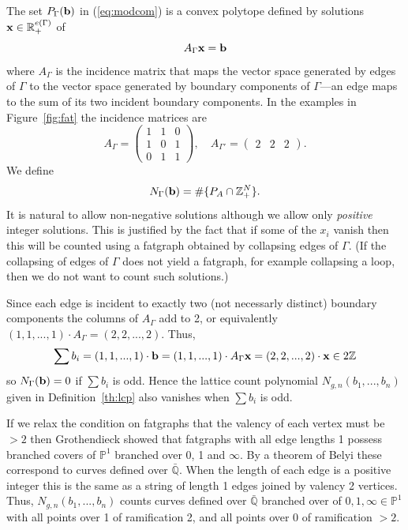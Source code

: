 \documentclass{amsart}
\newcommand{\bp}{\mathbb{P}}
\newcommand{\bq}{\mathbb{Q}}
\newcommand{\br}{\mathbb{R}}
\newcommand{\bz}{\mathbb{Z}}
\begin{document}
The set $P_{\Gamma}({\bf b})$ in (\ref{eq:modcom}) is a convex polytope defined by solutions ${\bf x}\in\br_+^{e(\Gamma)}$ of
\[ A_{\Gamma}{\bf x}={\bf b}\]
where $A_{\Gamma}$ is the incidence matrix that maps the vector space generated by edges of $\Gamma$ to the vector space generated by boundary components of $\Gamma$---an edge maps to the sum of its two incident boundary components.  In the examples in Figure~\ref{fig:fat} the incidence matrices are
\[ A_{\Gamma}=\left(\begin{array}{ccc}1&1&0\\1&0&1\\0&1&1\end{array}\right),\quad A_{\Gamma'}=\left(\begin{array}{ccc}2&2&2\end{array}\right).\]
We define 
\[ N_{\Gamma}({\bf b})=\#\{P_A\cap\bz_+^N\}.\]
It is natural to allow non-negative solutions although we allow only {\em positive} integer solutions.  This is justified by the fact that if some of the $x_i$ vanish then this will be counted using a fatgraph obtained by collapsing edges of $\Gamma$.  (If the collapsing of edges of $\Gamma$ does not yield a fatgraph, for example collapsing a loop, then we do not want to count such solutions.)

Since each edge is incident to exactly two (not necessarly distinct) boundary components the columns of $A_{\Gamma}$ add to 2, or equivalently $(1,1,...,1)\cdot A_{\Gamma}=(2,2,...,2)$.  Thus, 
\[\sum b_i=(1,1,...,1)\cdot{\bf b}=(1,1,...,1)\cdot A_{\Gamma}{\bf x}=(2,2,...,2)\cdot{\bf x}\in 2\bz\] 
so $N_{\Gamma}({\bf b})=0$ if $\sum b_i$ is odd.  Hence the lattice count polynomial $N_{g,n}(b_1,...,b_n)$ given in Definition~\ref{th:lcp}
also vanishes when $\sum b_i$ is odd.

If we relax the condition on fatgraphs that the valency of each vertex must be $>2$ then Grothendieck \cite{GroEsq} showed that fatgraphs with all edge lengths 1 possess branched covers of $\bp^1$ branched over 0, 1 and $\infty$.  By a theorem of Belyi these correspond to curves defined over $\bar{\bq}$.  When the length of each edge is a positive integer this is the same as a string of length 1 edges joined by valency 2 vertices.  Thus, $N_{g,n}(b_1,...,b_n)$ counts curves defined over $\bar{\bq}$ branched over of $0,1,\infty\in\bp^1$ with all points over 1 of ramification 2, and all points over 0 of ramification $>2$.
\end{document}
